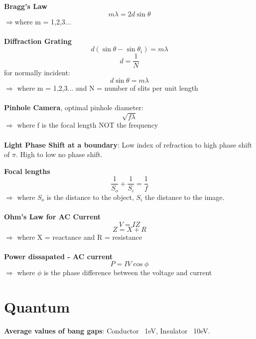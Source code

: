 \documentclass{article}
\begin{document}
{{\bf{Bragg's Law}}\begin{equation} m\lambda = 2d\sin{\theta}\end{equation}
$\Rightarrow$where m = 1,2,3...\\
\\
{\bf{Diffraction Grating}}\begin{equation}d(\sin{\theta}-\sin{\theta_i}) = m\lambda \end{equation}
\begin{equation}d = \frac{1}{N}\end{equation}
\hspace*{.5in}for normally incident:
\begin{equation}d\sin{\theta} = m\lambda\end{equation}
$\Rightarrow$ where m = 1,2,3... and N = number of slits per unit length\\
\\
{\bf{Pinhole Camera}}, optimal pinhole diameter:\begin{equation}\sqrt{f\lambda}\end{equation}
$\Rightarrow$ where f is the focal length NOT the frequency\\
\\
{\bf{Light Phase Shift at a boundary}}: Low index of refraction to high phase shift of $\pi$.  High to low no phase shift.

{\bf{Focal lengths}}\begin{equation}\frac{1}{S_o}+\frac{1}{S_i} = \frac{1}{f}\end{equation}
$\Rightarrow$ where $S_o$ is the distance to the object, $S_i$ the distance to the image.\\
\\
{\bf{Ohm's Law for AC Current}}\begin{equation}V = IZ\end{equation}
\begin{equation}Z = X + R\end{equation}
$\Rightarrow$ where X = reactance and R = resistance\\
\\
{\bf{Power dissapated - AC current}}\begin{equation}P = IV\cos{\phi}\end{equation}
$\Rightarrow$ where $\phi$ is the phase difference between the voltage and current 




\section{Quantum}
{\bf{Average values of bang gaps}}: Conductor ~1eV, Insulator ~10eV.\\






}
\end{document}
